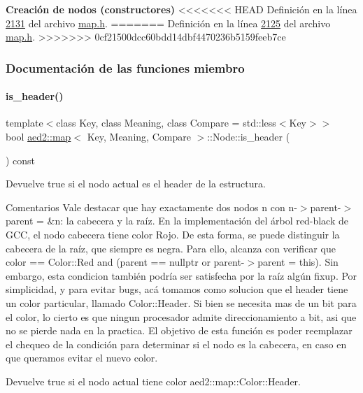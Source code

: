 \begin{Indent}{\bf \-Creación de nodos (constructores)}
<<<<<<< HEAD
\-Definición en la línea \hyperlink{map_8h_source_l02131}{2131} del archivo \hyperlink{map_8h_source}{map.\-h}.
=======
Definición en la línea \hyperlink{map_8h_source_l02125}{2125} del archivo \hyperlink{map_8h_source}{map.\+h}.
>>>>>>> 0cf21500dcc60bdd14dbf4470236b5159feeb7ce



\subsubsection{Documentación de las funciones miembro}
\mbox{\label{structaed2_1_1map_1_1Node_ab684678442a3c5f53eb00ed48a9270a9_ab684678442a3c5f53eb00ed48a9270a9}} 
\paragraph{\texorpdfstring{is\+\_\+header()}{is\_header()}}
{\footnotesize\ttfamily template$<$class Key, class Meaning, class Compare = std\+::less$<$\+Key$>$$>$ \\
bool \hyperlink{classaed2_1_1map}{aed2\+::map}$<$ Key, Meaning, Compare $>$\+::Node\+::is\+\_\+header (\begin{DoxyParamCaption}{ }\end{DoxyParamCaption}) const\hspace{0.3cm}{\ttfamily [inline]}}



Devuelve true si el nodo actual es el header de la estructura. 

\begin{DoxyRemark}{Comentarios}
Vale destacar que hay exactamente dos nodos n con n-\/$>$parent-\/$>$parent = \&n\+: la cabecera y la raíz. En la implementación del árbol red-\/black de G\+CC, el nodo cabecera tiene color Rojo. De esta forma, se puede distinguir la cabecera de la raíz, que siempre es negra. Para ello, alcanza con verificar que {\ttfamily color == Color\+::\+Red and (parent == nullptr or parent-\/$>$parent = this)}. Sin embargo, esta condicion también podría ser satisfecha por la raíz algún {\ttfamily fixup}. Por simplicidad, y para evitar bugs, acá tomamos como solucion que el header tiene un color particular, llamado Color\+::\+Header. Si bien se necesita mas de un bit para el color, lo cierto es que ningun procesador admite direccionamiento a bit, asi que no se pierde nada en la practica. El objetivo de esta función es poder reemplazar el chequeo de la condición para determinar si el nodo es la cabecera, en caso en que queramos evitar el nuevo color.
\end{DoxyRemark}
\begin{DoxyReturn}{Devuelve}
true si el nodo actual tiene color aed2\+::map\+::\+Color\+::\+Header.
\end{DoxyReturn}


\end{Indent}
